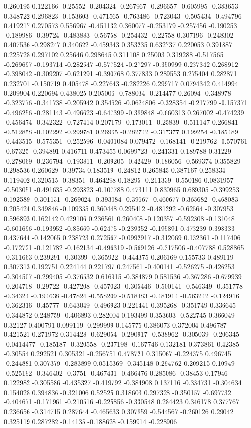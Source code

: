 0.260195 0.122166 -0.25552 -0.204324 -0.267967 -0.296657 -0.605995 -0.383653 0.348722 0.296823 -0.153603 -0.471565 -0.763486 -0.723043 -0.505434 -0.494796 0.419217 0.270573 0.556967 -0.451132 0.360077 -0.253179 -0.257456 -0.190253 -0.189986 -0.39724 -0.483883 -0.56758 -0.254432 -0.22758 0.307196 -0.248302 0.407536 -0.298247 0.340622 -0.459343 0.353235 0.632737 0.220053 0.391887 0.225728 0.297102 0.25646 0.298645 0.311108 0.25003 0.319288 -0.517565 -0.269697 -0.193714 -0.282547 -0.577524 -0.27297 -0.350999 0.237342 0.268912 -0.398042 -0.309207 -0.621291 -0.390768 0.377833 0.289553 0.275404 0.282871 0.232701 -0.150719 0.405478 -0.227643 -0.282226 0.299717 0.0794342 0.414994 0.209904 0.220694 0.438025 0.205006 -0.788034 -0.214477 0.26094 -0.348978 -0.323776 -0.341738 -0.205942 0.354626 -0.0624806 -0.328354 -0.217799 -0.157371 -0.496256 -0.281143 -0.496623 -0.647399 -0.389848 -0.660313 0.267002 -0.474239 -0.456474 -0.342322 -0.727414 0.207179 -0.173011 -0.25839 -0.511147 0.266841 -0.512858 -0.102292 -0.299781 0.26965 -0.282742 -0.317377 0.199254 -0.185489 -0.443515 -0.575351 -0.252596 -0.0401084 0.079472 -0.168141 -0.219762 -0.570761 -0.67325 -0.394891 0.416711 0.473455 0.0699723 -0.241331 0.189788 0.31229 -0.278069 -0.236794 -0.193811 -0.209205 -0.42429 -0.186056 -0.569374 0.355829 0.298536 0.260629 -0.39734 0.183519 -0.24812 0.265845 0.387167 0.258334 0.119402 0.320515 -0.38351 -0.464298 0.18295 -0.211339 -0.550186 0.0831957 -0.503051 -0.491635 -0.293823 -0.107788 0.473111 0.830965 0.689305 -0.399253 0.192589 -0.301131 -0.269024 -0.393084 -0.39667 -0.460677 0.365682 -0.468083 0.205424 0.349846 -0.109335 0.360448 0.295412 -0.481292 -0.62564 -0.307953 0.596893 0.162142 0.429106 0.236561 0.260408 -0.120357 -0.592308 -0.131048 -0.601696 -0.193952 -0.85669 -0.62475 -0.239352 -0.195891 0.473239 0.398333 0.437644 -0.142065 0.238723 0.272567 -0.0992917 -0.312069 0.132361 -0.117406 -0.172721 -0.121782 -0.162134 -0.496319 -0.569126 -0.317506 -0.407788 0.528865 -0.311663 0.239291 -0.30399 -0.365922 -0.444375 0.206169 0.155733 0.489119 0.307313 0.192751 0.224144 0.221797 0.247561 -0.400141 -0.526275 -0.426253 -0.304507 -0.299405 -0.376532 0.616915 -0.384879 0.581536 -0.367286 -0.679939 -0.204708 -0.29722 -0.427208 -0.457023 -0.305446 -0.500141 -0.546349 -0.351778 -0.34324 -0.194638 -0.47824 -0.558209 -0.518483 -0.481914 -0.563242 -0.124916 -0.362316 -0.45777 -0.643049 -0.496923 0.221441 0.395268 -0.351749 0.336645 -0.344872 0.248759 -0.406893 0.282004 0.193499 0.353603 -0.522745 0.366049 0.32127 0.400791 0.099119 -0.299999 0.145775 0.386073 0.372004 0.496787 0.421521 0.271972 0.314428 -0.629054 -0.290917 -0.538962 -0.305039 -0.206345 -0.0414477 -0.185187 -0.320558 -0.237198 -0.167746 0.132181 0.373861 0.42385 -0.30554 0.292521 0.305321 -0.256751 0.478721 0.315067 -0.224375 0.496745 -0.244881 0.307379 -0.283899 0.0515369 -0.345148 0.294762 0.209215 0.10949 -0.525192 -0.346402 -0.3751 -0.467431 -0.466476 0.285086 -0.38453 0.17946 0.122982 -0.305586 -0.435327 -0.419792 -0.384908 0.137116 -0.334731 -0.304634 0.154028 0.394836 -0.321006 0.52525 0.318603 0.297328 -0.350157 -0.697732 -0.404671 -0.171961 -0.210516 -0.225856 -0.330548 0.284423 0.346178 0.377767 0.236656 -0.314715 0.287644 -0.465633 0.307859 -0.544567 -0.260126 0.29042 0.325119 0.287282 -0.14135 -0.188628 -0.159914 -0.228906 